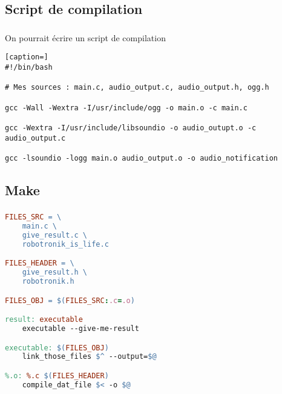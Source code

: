 \subsection{Script de compilation}
\begin{frame}[fragile]
\frametitle{\insertsubsection}

On pourrait écrire un script de compilation\…
\begin{lstlisting}[caption=]
#!/bin/bash

# Mes sources : main.c, audio_output.c, audio_output.h, ogg.h

gcc -Wall -Wextra -I/usr/include/ogg -o main.o -c main.c 

gcc -Wextra -I/usr/include/libsoundio -o audio_outupt.o -c audio_output.c

gcc -lsoundio -logg main.o audio_output.o -o audio_notification

\end{lstlisting}
\end{frame}

\subsection{Make}
\begin{frame}[fragile]
\frametitle{\insertsubsection}

\begin{lstlisting}[language=make, caption=Un Makefile classique]
FILES_SRC = \
    main.c \
    give_result.c \
    robotronik_is_life.c

FILES_HEADER = \
    give_result.h \
    robotronik.h

FILES_OBJ = $(FILES_SRC:.c=.o)

result: executable
    executable --give-me-result

executable: $(FILES_OBJ)
    link_those_files $^ --output=$@

%.o: %.c $(FILES_HEADER)
    compile_dat_file $< -o $@
\end{lstlisting}
\end{frame}

